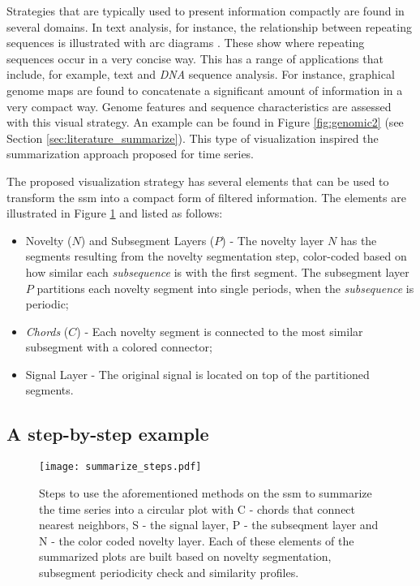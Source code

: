 Strategies that are typically used to present information compactly are found in several domains. In text analysis, for instance, the relationship between repeating sequences is illustrated with arc diagrams \cite{bitmap, arcplots}. These show where repeating sequences occur in a very concise way. This has a range of applications that include, for example, text and \textit{DNA} sequence analysis. For instance, graphical genome maps are found to concatenate a significant amount of information in a very compact way. Genome features and sequence characteristics are assessed with this visual strategy. An example can be found in Figure \ref{fig:genomic2} (see Section \ref{sec:literature_summarize}). This type of visualization inspired the summarization approach proposed for time series.
\par
The proposed visualization strategy has several elements that can be used to transform the \gls{ssm} into a compact form of filtered information. The elements are  illustrated in Figure \ref{fig:summarize_steps} and listed as follows:
\begin{itemize}
	\item Novelty ($N$) and Subsegment Layers ($P$) - The novelty layer $N$ has the segments resulting from the novelty segmentation step, color-coded based on how similar each \textit{subsequence} is with the first segment. The subsegment layer $P$ partitions each novelty segment into single periods, when the \textit{subsequence} is periodic;
	\item \textit{Chords} ($C$) - Each novelty segment is connected to the most similar subsegment with a colored connector;
	\item Signal Layer - The original signal is located on top of the partitioned segments.
\end{itemize}


\subsection{A step-by-step example}

\begin{figure}
\centering
\texttt{[image: summarize\_steps.pdf]}
\caption{Steps to use the aforementioned methods on the \gls{ssm} to summarize the time series into a circular plot with C - chords that connect nearest neighbors, S - the signal layer, P - the subseqment layer and N - the color coded novelty layer. Each of these elements of the summarized plots are built based on novelty segmentation, subsegment periodicity check and similarity profiles.}
\label{fig:summarize_steps}
\end{figure}

